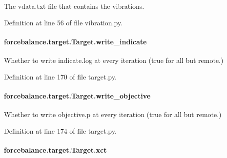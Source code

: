 The vdata.\-txt file that contains the vibrations. 



Definition at line 56 of file vibration.\-py.

\hypertarget{classforcebalance_1_1target_1_1Target_a3a2f5d4bbb8d6ecb580eadb261977a57}{
\paragraph[{write\-\_\-indicate}]{\setlength{\rightskip}{0pt plus 5cm}forcebalance.\-target.\-Target.\-write\-\_\-indicate\hspace{0.3cm}{\ttfamily [inherited]}}}\label{classforcebalance_1_1target_1_1Target_a3a2f5d4bbb8d6ecb580eadb261977a57}


Whether to write indicate.\-log at every iteration (true for all but remote.) 



Definition at line 170 of file target.\-py.

\hypertarget{classforcebalance_1_1target_1_1Target_a7a95624dfe03f0cee0e5f1ae09db306a}{
\paragraph[{write\-\_\-objective}]{\setlength{\rightskip}{0pt plus 5cm}forcebalance.\-target.\-Target.\-write\-\_\-objective\hspace{0.3cm}{\ttfamily [inherited]}}}\label{classforcebalance_1_1target_1_1Target_a7a95624dfe03f0cee0e5f1ae09db306a}


Whether to write objective.\-p at every iteration (true for all but remote.) 



Definition at line 174 of file target.\-py.

\hypertarget{classforcebalance_1_1target_1_1Target_aad2e385cfbf7b4a68f1c2cb41133fe82}{
\paragraph[{xct}]{\setlength{\rightskip}{0pt plus 5cm}forcebalance.\-target.\-Target.\-xct\hspace{0.3cm}{\ttfamily [inherited]}}}\label{classforcebalance_1_1target_1_1Target_aad2e385cfbf7b4a68f1c2cb41133fe82}


